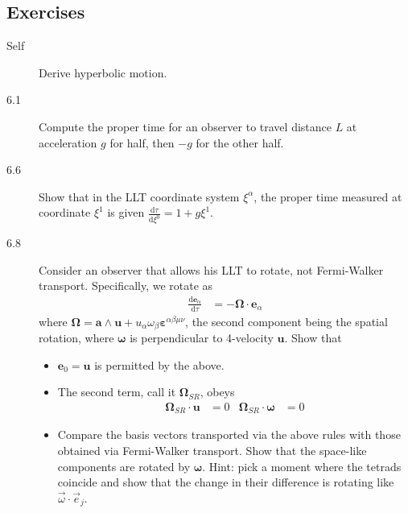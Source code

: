 \documentclass[12pt]{report}
\newcommand{\rd}[2]{\frac{\mathrm{d}#1}{\mathrm{d}#2}}
\begin{document}
\subsection{Exercises}

\begin{description}
    \item[Self] Derive hyperbolic motion.

    \item[6.1] Compute the proper time for an observer to travel distance $L$ at
        acceleration $g$ for half, then $-g$ for the other half.

    \item[6.6] Show that in the LLT coordinate system $\xi^\alpha$, the proper
        time measured at coordinate $\xi^1$ is given $\rd{\tau}{\xi^0} =
        1 + g\xi^1$.

    \item[6.8] Consider an observer that allows his LLT to rotate, not
        Fermi-Walker transport. Specifically, we rotate as
        \begin{align}
            \rd{\mathbf{e}_\alpha}{\tau} &= -\mathbf{\Omega} \cdot
            \mathbf{e}_\alpha
        \end{align}
        where $\mathbf{\Omega} = \mathbf{a} \wedge \mathbf{u} +
        u_\alpha \omega_\beta \mathbf{\varepsilon}^{\alpha \beta \mu \nu}$, the
        second component being the spatial rotation, where $\mathbf{\omega}$ is
        perpendicular to 4-velocity $\mathbf{u}$. Show that
        \begin{itemize}
            \item $\mathbf{e}_0 = \mathbf{u}$ is permitted by the above.

            \item The second term, call it $\mathbf{\Omega}_{SR}$, obeys
                \begin{align*}
                    \mathbf{\Omega}_{SR} \cdot \mathbf{u} &= 0 &
                    \mathbf{\Omega}_{SR} \cdot \mathbf{\omega} &= 0
                \end{align*}

            \item Compare the basis vectors transported via the above rules with
                those obtained via Fermi-Walker transport. Show that the
                space-like components are rotated by $\mathbf{\omega}$. Hint:
                pick a moment where the tetrads coincide and show that the
                change in their difference is rotating like $\vec{\omega} \cdot
                \vec{e}_{j}$.
        \end{itemize}
\end{description}
\end{document}

